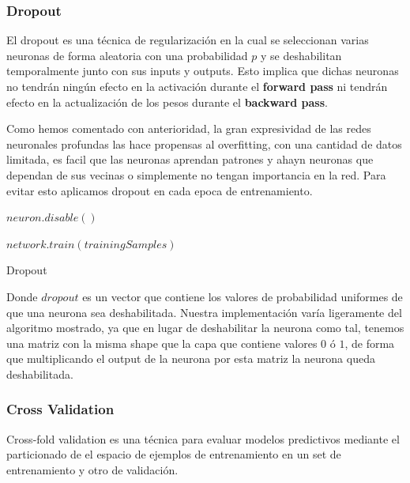 \newpage
\subsubsection{Dropout}
\label{subsubsec:nn:backprop:dropout}

El dropout es una técnica de regularización en la cual se seleccionan varias neuronas de forma aleatoria con una probabilidad $p$ y se deshabilitan temporalmente junto con sus inputs y outputs. Esto implica que dichas neuronas no tendrán ningún efecto en la activación durante el \textbf{forward pass} ni tendrán efecto en la actualización de los pesos durante el \textbf{backward pass}.

Como hemos comentado con anterioridad, la gran expresividad de las redes neuronales profundas las hace propensas al overfitting, con una cantidad de datos limitada, es facil que las neuronas aprendan patrones y ahayn neuronas que dependan de sus vecinas o simplemente no tengan importancia en la red. Para evitar esto aplicamos dropout en cada epoca de entrenamiento.

\begin{algorithm}
    {
        {
            {
                 {
                    $neuron.disable()$
                 }
            }    
        }
        
        $network.train(trainingSamples)$
    }    
	\caption{Dropout}
	\label{alg:dropout}
\end{algorithm}

Donde $dropout$ es un vector que contiene los valores de probabilidad uniformes de que una neurona sea deshabilitada. Nuestra implementación varía ligeramente del algoritmo mostrado, ya que en lugar de deshabilitar la neurona como tal, tenemos una matriz con la misma shape que la capa que contiene valores $0$ ó $1$, de forma que multiplicando el output de la neurona por esta matriz la neurona queda deshabilitada.

\newpage
\subsubsection{Cross Validation}
\label{subsubsec:nn:backprop:crossVal}

Cross-fold validation es una técnica para evaluar modelos predictivos mediante el particionado de el espacio de ejemplos de entrenamiento en un set de entrenamiento y otro de validación.

